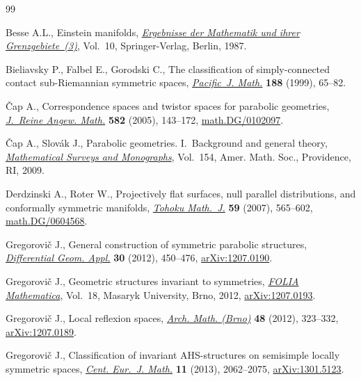 \documentclass[10pt,a4paper]{amsart}
\numberwithin{equation}{section}
\begin{document}
\begin{thebibliography}{99}
\footnotesize\itemsep=0pt

Besse A.L., Einstein manifolds, \href{https://doi.org/10.1007/978-3-540-74311-8}{\textit{Ergebnisse der Mathematik und ihrer
 Grenzgebiete~(3)}}, Vol.~10, Springer-Verlag, Berlin, 1987.

Bieliavsky P., Falbel E., Gorodski C., The classif\/ication of simply-connected
 contact sub-{R}iemannian symmetric spaces, \href{https://doi.org/10.2140/pjm.1999.188.65}{\textit{Pacific~J. Math.}}
 \textbf{188} (1999), 65--82.

\v{C}ap A., Correspondence spaces and twistor spaces for parabolic geometries,
 \href{https://doi.org/10.1515/crll.2005.2005.582.143}{\textit{J.~Reine Angew. Math.}} \textbf{582} (2005), 143--172,
 \href{http://arxiv.org/abs/math.DG/0102097}{math.DG/0102097}.

\v{C}ap A., Slov\'ak J., Parabolic geometries. {I}.~Background and general
 theory, \href{https://doi.org/10.1090/surv/154}{\textit{Mathematical Surveys and Monographs}}, Vol.~154, Amer. Math.
 Soc., Providence, RI, 2009.

Derdzinski A., Roter W., Projectively f\/lat surfaces, null parallel
 distributions, and conformally symmetric manifolds, \href{https://doi.org/10.2748/tmj/1199649875}{\textit{Tohoku Math.~J.}}
 \textbf{59} (2007), 565--602, \href{http://arxiv.org/abs/math.DG/0604568}{math.DG/0604568}.

Gregorovi\v{c} J., General construction of symmetric parabolic structures,
 \href{https://doi.org/10.1016/j.difgeo.2012.06.006}{\textit{Differential Geom. Appl.}} \textbf{30} (2012), 450--476,
 \href{http://arxiv.org/abs/1207.0190}{arXiv:1207.0190}.

Gregorovi\v{c} J., Geometric structures invariant to symmetries, \href{https://doi.org/10.5817/CZ.MUNI.M210-6010-2012}{\textit{FOLIA
 Mathematica}}, Vol.~18, Masaryk University, Brno, 2012, \href{http://arxiv.org/abs/1207.0193}{arXiv:1207.0193}.

Gregorovi\v{c} J., Local ref\/lexion spaces, \href{https://doi.org/10.5817/AM2012-5-323}{\textit{Arch. Math. (Brno)}}
 \textbf{48} (2012), 323--332, \href{http://arxiv.org/abs/1207.0189}{arXiv:1207.0189}.

Gregorovi\v{c} J., Classif\/ication of invariant {AHS}-structures on semisimple
 locally symmetric spaces, \href{https://doi.org/10.2478/s11533-013-0318-5}{\textit{Cent. Eur.~J. Math.}} \textbf{11} (2013),
 2062--2075, \href{http://arxiv.org/abs/1301.5123}{arXiv:1301.5123}.


\end{thebibliography}
\end{document}
